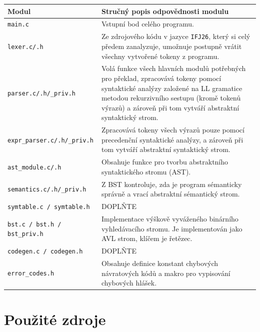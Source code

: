 \documentclass[10pt,a4paper]{article}
\begin{document}
\begin{longtable}{p{}p{}}
    \toprule
    \textbf{Modul} & \textbf{Stručný popis odpovědnosti modulu} \\
    \midrule
    \texttt{main.c} & Vstupní bod celého programu. \\
    \texttt{lexer.c/.h} & Ze zdrojového kódu v jazyce \texttt{IFJ26}, který si
     celý předem zanalyzuje, umožnuje postupně vrátit všechny vytvořené tokeny
      z programu.  \\
    \texttt{parser.c/.h/\_priv.h} & Volá funkce všech hlavních modulů potřebných
     pro překlad, zpracovává tokeny pomocí syntaktické analýzy založené na 
     LL gramatice metodou rekurzivního sestupu (kromě tokenů výrazů) a zároveň 
     při tom vytváří abstraktní syntaktický strom. \\
    \texttt{expr\_parser.c/.h/\_priv.h} & Zpracovává tokeny všech výrazů pouze pomocí
     precedenční syntaktické analýzy, a zároveň při tom vytváří abstraktní 
     syntaktický strom. \\
    \texttt{ast\_module.c/.h} & Obsahuje funkce pro tvorbu abstraktního
     syntaktického stromu (AST). \\
    \texttt{semantics.c/.h/\_priv.h} & Z BST kontroluje, zda je program 
     sémanticky správně a vrací abstraktní sémantický strom.\\
    \texttt{symtable.c / symtable.h} & DOPLŇTE \\
    \texttt{bst.c / bst.h / bst\_priv.h} & Implementace výškově vyváženého 
    binárního vyhledávacího stromu. Je implementován jako AVL strom, klíčem 
    je řetězec. \\
    \texttt{codegen.c / codegen.h} & DOPLŇTE \\
     
    \texttt{error\_codes.h} & Obsahuje definice konstant chybových 
    návratových kódů a makro pro vypisování chybových hlášek. \\
     
    \bottomrule
\end{longtable}



\section{Použité zdroje}
\end{document}
